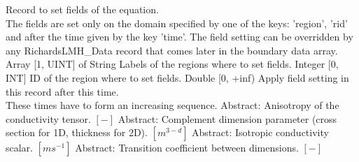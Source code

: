 \begin{RecordType}
	{}
	{} %
	{} %
	{} %
	{{{Record to set fields of the equation.}\\{
The fields are set only on the domain specified by one of the keys: 'region', 'rid'}\\{
and after the time given by the key 'time'. The field setting can be overridden by}\\{
 any RichardsLMH{\_}Data record that comes later in the boundary data array.}}}
		\KeyItem
			{}
			{{Array [1, UINT] of }{String}}
			{\textrangle}
			{} %
			{{{Labels of the regions where to set fields. }}}
		\KeyItem
			{}
			{{Integer [0, INT]}}
			{\textrangle}
			{} %
			{{{ID of the region where to set fields.}}}
		\KeyItem
			{}
			{{Double [0, +inf)}}
			{\textrangle}
			{} %
			{{{Apply field setting in this record after this time.}\\{
These times have to form an increasing sequence.}}}
		\KeyItem
			{}
			{{Abstract}{: }}
			{\textrangle}
			{} %
			{{{Anisotropy of the conductivity tensor. }{$[-]$}}}
		\KeyItem
			{}
			{{Abstract}{: }}
			{\textrangle}
			{} %
			{{{Complement dimension parameter (cross section for 1D, thickness for 2D). }{$[m^{3-d}]$}}}
		\KeyItem
			{}
			{{Abstract}{: }}
			{\textrangle}
			{} %
			{{{Isotropic conductivity scalar. }{$[ms^{-1}]$}}}
		\KeyItem
			{}
			{{Abstract}{: }}
			{\textrangle}
			{} %
			{{{Transition coefficient between dimensions. }{$[-]$}}}

\end{RecordType}
